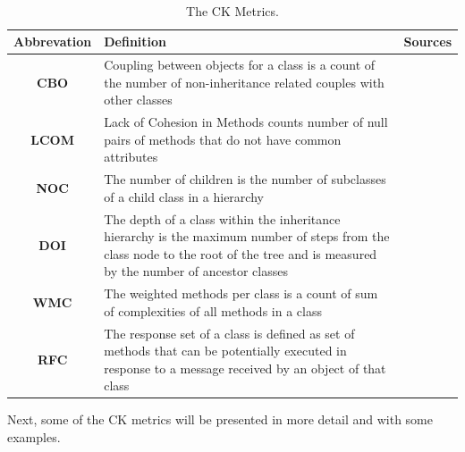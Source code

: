 \begin{table}
	\caption{The CK Metrics.}~\label{tab:metrics}
	
	\setlength\tabcolsep{3pt}
	\renewcommand{\arraystretch}{1.4}%
	\begin{tabularx}{\columnwidth}{ | c | p{5.6cm} || c | }
		\hline
		Abbrevation & Definition & Sources \\ \hline\hline
		\textbf{CBO} & Coupling between objects for a class is a count of the number of non-inheritance related couples with other classes & \cite{b15chidamber1991towards, b1aggarwal2007investigating, b3al2012fault} \\ \hline
		\textbf{LCOM} & Lack of Cohesion in Methods counts number of null pairs of methods that do not have common attributes & \cite{b15chidamber1991towards, b1aggarwal2007investigating} \\ \hline
		\textbf{NOC} & The number of children is the number of subclasses of a child class in a hierarchy & \cite{b15chidamber1991towards, b1aggarwal2007investigating} \\ \hline
		\textbf{DOI} & The depth of a class within the inheritance hierarchy is the maximum number of steps from the class node to the root of the tree and is measured by the number of ancestor classes & \cite{b15chidamber1991towards, b1aggarwal2007investigating} \\ \hline
		\textbf{WMC} & The weighted methods per class is a count of sum of complexities of all methods in a class & \cite{b15chidamber1991towards, b1aggarwal2007investigating} \\ \hline
		\textbf{RFC} & The response set of a class is defined as set of methods that can be potentially executed in response to a message received by an object of that class & \cite{b15chidamber1991towards, b1aggarwal2007investigating} \\ \hline
	\end{tabularx}
\end{table}

Next, some of the CK metrics will be presented in more detail and with some examples.


